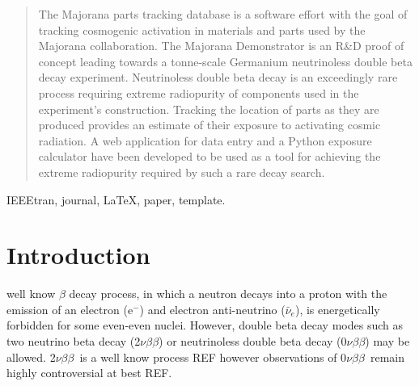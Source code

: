 \documentclass[journal]{IEEEtran}
\def\znbb{0$\nu\beta\beta$}
\def\tnbb{2$\nu\beta\beta$}
\def\elec{e$^{-}$}
\def\elanu{$\bar{\nu}_{e}$}
\begin{document}




\maketitle

\begin{abstract}
The Majorana parts tracking database is a software effort with the goal of tracking
cosmogenic activation in materials and parts used by the Majorana collaboration. The
Majorana Demonstrator is an R\&D proof of concept leading towards a tonne-scale Germanium
neutrinoless double beta decay experiment. Neutrinoless double beta decay is an exceedingly
rare process requiring extreme radiopurity of components used in the experiment's
construction. Tracking the location of parts as they are produced provides an estimate
of their exposure to activating cosmic radiation. A web application for data entry
and a Python exposure calculator have been developed to be used as a tool for
achieving the extreme radiopurity required by such a rare decay search.
\end{abstract}

\begin{IEEEkeywords}
IEEEtran, journal, \LaTeX, paper, template.
\end{IEEEkeywords}






%
\IEEEpeerreviewmaketitle



\section{Introduction}
 well know $\beta$ decay process, in which a neutron decays into
a proton with the emission of an electron (\elec) and electron 
anti-neutrino (\elanu), is energetically forbidden for some even-even
nuclei. However, double beta decay modes such as two neutrino beta decay (\tnbb)
 or neutrinoless double beta decay (\znbb) may be allowed.
\tnbb\ is a well know process REF however observations of \znbb\ remain highly
controversial at best REF. 
\end{document}
